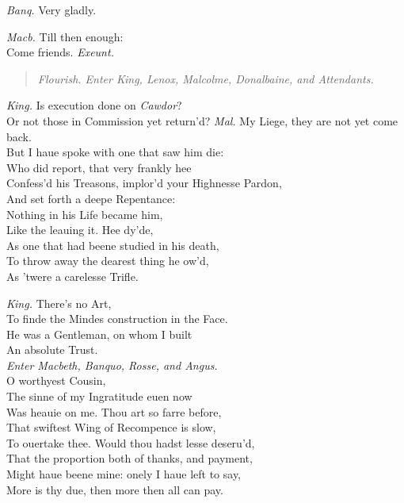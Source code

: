 \documentclass[12pt]{sides}
\newcommand{\StageDir}[1]{\begin{quote}\centering\em #1\end{quote}}
\newcommand{\clStageDir}[1]{\hspace*{\fill}\textit{#1}\hspace*{\fill}}
\newcommand{\dia}[1]{\hskip 15pt\textit{#1}\hskip 6pt}
\begin{document}
\begin{multicols}{2}
            \dia{Banq.} Very gladly.

            \dia{Macb.} Till then enough: \\ Come friends. \hspace*{\fill}\textit{Exeunt.}\hspace*{\fill}

            \StageDir{Flourish. Enter King, Lenox, Malcolme, Donalbaine, and Attendants.}

            \dia{King.} Is execution done on \textit{Cawdor}? \\ Or not those in Commission yet return'd?
            \newline
            \dia{Mal.} My Liege, they are not yet come back. \\ But I haue spoke with one that saw him die: \\ Who did report, that very frankly hee \\ Confess'd his Treasons, implor'd your Highnesse Pardon, \\ And set forth a deepe Repentance: \\ Nothing in his Life became him, \\ Like the leauing it. Hee dy'de, \\ As one that had beene studied in his death, \\ To throw away the dearest thing he ow'd, \\ As 'twere a carelesse Trifle. %

            \dia{King.} There's no Art, \\ To finde the Mindes construction in the Face. \\ He was a Gentleman, on whom I built \\ An absolute Trust. \\ \clStageDir{Enter Macbeth, Banquo, Rosse, and Angus.} \\ O worthyest Cousin, \\ The sinne of my Ingratitude euen now \\ Was heauie on me. Thou art so farre before, \\ That swiftest Wing of Recompence is slow, \\ To ouertake thee. Would thou hadst lesse deseru'd, \\ That the proportion both of thanks, and payment, \\ Might haue beene mine: onely I haue left to say, \\ More is thy due, then more then all can pay.


\end{multicols}
\end{document}

